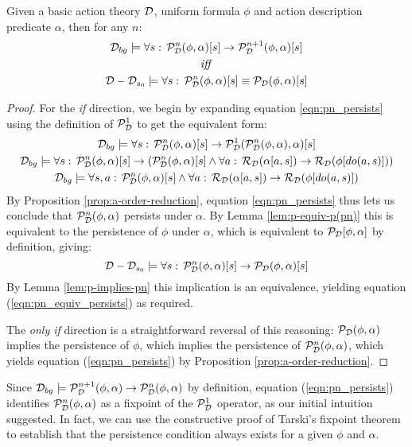 \begin{thm}
Given a basic action theory $\mathcal{D}$, uniform formula $\phi$ and action
description predicate $\alpha$, then for any $n$:\label{thm:p(pn)-equiv-p}\begin{gather}
\mathcal{D}_{bg}\models\forall s:\,\mathcal{P}_{\mathcal{D}}^{n}(\phi,\alpha)[s]\rightarrow\mathcal{P}_{\mathcal{D}}^{n+1}(\phi,\alpha)[s]\label{eqn:pn_persists}\\
\mathit{iff}\nonumber \\
\mathcal{D}-\mathcal{D}_{s_{0}}\models\forall s:\,\mathcal{P}_{\mathcal{D}}^{n}(\phi,\alpha)[s]\equiv\mathcal{P}_{\mathcal{D}}(\phi,\alpha)[s]\label{eqn:pn_equiv_persists}\end{gather}

\end{thm}
\begin{proof}
For the \emph{if} direction, we begin by expanding equation \eqref{eqn:pn_persists}
using the definition of $\mathcal{P}_{\mathcal{D}}^{1}$ to get the equivalent form:\begin{gather*}
\mathcal{D}_{bg}\models\forall s:\,\mathcal{P}_{\mathcal{D}}^{n}(\phi,\alpha)[s]\rightarrow\mathcal{P}_{\mathcal{D}}^{1}(\mathcal{P}_{\mathcal{D}}^{n}(\phi,\alpha),\alpha)[s]\\
\mathcal{D}_{bg}\models\forall s:\,\mathcal{P}_{\mathcal{D}}^{n}(\phi,\alpha)[s]\rightarrow\left(\mathcal{P}_{\mathcal{D}}^{n}(\phi,\alpha)[s]\wedge\forall a:\,\mathcal{R}_{\mathcal{D}}(\alpha[a,s])\rightarrow\mathcal{R}_{\mathcal{D}}(\phi[do(a,s)])\right)\\
\mathcal{D}_{bg}\models\forall s,a:\,\mathcal{P}_{\mathcal{D}}^{n}(\phi,\alpha)[s]\wedge\forall a:\,\mathcal{R}_{\mathcal{D}}(\alpha[a,s])\rightarrow\mathcal{R}_{\mathcal{D}}(\phi[do(a,s)])\end{gather*}
 By Proposition \ref{prop:a-order-reduction}, equation \eqref{eqn:pn_persists}
thus lets us conclude that $\mathcal{P}_{\mathcal{D}}^{n}(\phi,\alpha)$ persists
under $\alpha$. By Lemma \ref{lem:p-equiv-p(pn)} this is equivalent
to the persistence of $\phi$ under $\alpha$, which is equivalent
to $\mathcal{P}_{\mathcal{D}}[\phi,\alpha]$ by definition, giving:\[
\mathcal{D}-\mathcal{D}_{s_{0}}\models\forall s:\,\mathcal{P}_{\mathcal{D}}^{n}(\phi,\alpha)[s]\rightarrow\mathcal{P}_{\mathcal{D}}(\phi,\alpha)[s]\]
 By Lemma \ref{lem:p-implies-pn} this implication is an equivalence,
yielding equation (\ref{eqn:pn_equiv_persists}) as required.

The \emph{only if} direction is a straightforward reversal of this
reasoning: $\mathcal{P}_{\mathcal{D}}(\phi,\alpha)$ implies the persistence of $\phi$,
which implies the persistence of $\mathcal{P}_{\mathcal{D}}^{n}(\phi,\alpha)$, which
yields equation (\ref{eqn:pn_persists}) by Proposition \ref{prop:a-order-reduction}. 
\end{proof}
Since $\mathcal{D}_{bg}\models\mathcal{P}_{\mathcal{D}}^{n+1}(\phi,\alpha)\rightarrow\mathcal{P}_{\mathcal{D}}^{n}(\phi,\alpha)$
by definition, equation (\ref{eqn:pn_persists}) identifies $\mathcal{P}_{\mathcal{D}}^{n}(\phi,\alpha)$
as a fixpoint of the $\mathcal{P}_{\mathcal{D}}^{1}$ operator, as our initial intuition
suggested. In fact, we can use the constructive proof of Tarski's
fixpoint theorem \citep{cousot79constructive_tarski} to establish
that the persistence condition always exists for a given $\phi$ and
$\alpha$.

